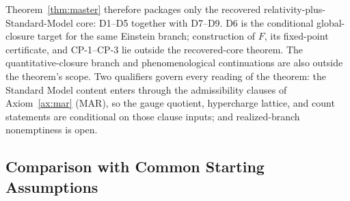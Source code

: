 \documentclass[11pt]{article}
\begin{document}
Theorem~\ref{thm:master} therefore packages only the recovered relativity-plus-Standard-Model core: D1--D5 together with D7--D9. D6 is the conditional global-closure target for the same Einstein branch; construction of \(F\), its fixed-point certificate, and CP-1--CP-3 lie outside the recovered-core theorem. The quantitative-closure branch and phenomenological continuations are also outside the theorem's scope. Two qualifiers govern every reading of the theorem: the Standard Model content enters through the admissibility clauses of Axiom~\ref{ax:mar} (MAR), so the gauge quotient, hypercharge lattice, and count statements are conditional on those clause inputs; and realized-branch nonemptiness is open.

\subsection*{Comparison with Common Starting Assumptions}
\end{document}
